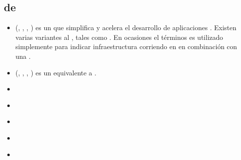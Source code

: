 \subsection{\fullstackAS \javaScriptNAME \frameworksPC}
\label{cap:estadoArte:section:fullstack_javaScript_framework}

\subsection{\stackAS de \javaScriptNAME \frameworksPC}
	\begin{itemize}
		\item
			\textbf{\meanstackNAME} (\mongodbNAME, \expressjsNAME, \angularjsNAME, \nodejsNAME) es un \fullstackAS \javaScriptNAME \frameworkPC que simplifica y acelera el desarrollo de aplicaciones \webINT \cite{online_mean_io}. Existen varias variantes al \stackAS \meanstackNAME, tales como \meenstackNAME. En ocasiones el términos es utilizado simplemente para indicar infraestructura corriendo en \nodejsNAME en combinación con una \dataBaseDB \nosqlNAME.
		\item
			\textbf{\meenstackNAME} \cite{online}(\mongodbNAME, \emberjsName, \expressjsNAME, \nodejsNAME) es un \fullstackAS \javaScriptNAME \frameworkPC equivalente a \meanstackNAMEref.
		\item
			\textbf{\socketStreamNAME}
		\item
			\textbf{\saneNAME}
		\item
			\textbf{\cokeNAME}
		\item
			\textbf{\sleekjsNAME}
		\item
			\textbf{\danfNAME}

	\end{itemize}
